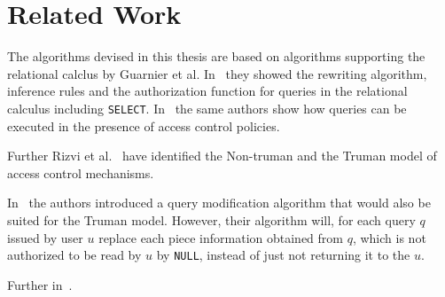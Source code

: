 \section{Related Work}

The algorithms devised in this thesis are based on algorithms supporting the relational calclus by Guarnier et al. In~\cite{guarnieri2016strong} they showed the rewriting algorithm, inference rules and the authorization function for queries in the relational calculus including \texttt{SELECT}.
%
In~\cite{guarnieri2014optimal} the same authors show how queries can be executed in the presence of access control policies.

Further Rizvi et al.~\cite{rizvi2004extending} have identified the Non-truman and the Truman model of access control mechanisms.

In~\cite{wang2007correctness} the authors introduced a query modification algorithm that would also be suited for the Truman model.
%
However, their algorithm will, for each query $q$ issued by user $u$ replace each piece information obtained from $q$, which is not authorized to be read by $u$ by \texttt{NULL}, instead of just not returning it to the $u$.
%

Further in~\cite{rizvi2004extending}.

